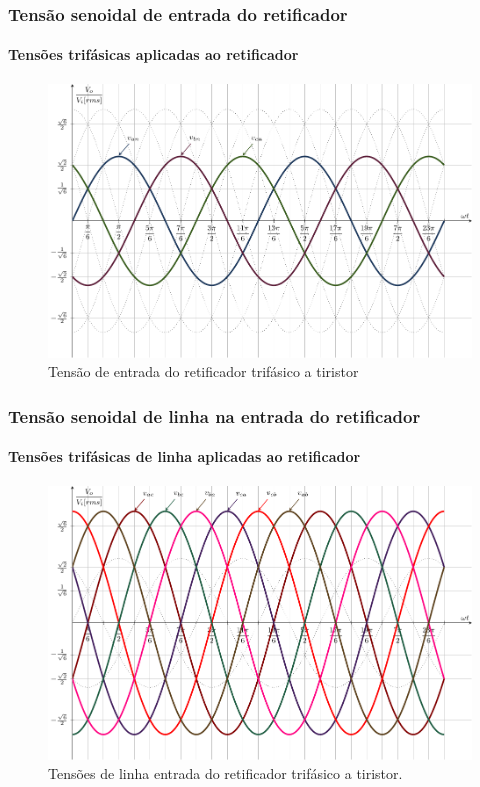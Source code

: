 \documentclass[aspectratio=43]{beamer}
\begin{document}
\begin{frame}
	\frametitle{Tensão senoidal de entrada do retificador}
		\framesubtitle{Tensões trifásicas aplicadas ao retificador}
\begin{figure}
	\centering
	\includegraphics[width=0.8\linewidth]{figuras/SenosDrawVabcnSEQn}
	\caption{Tensão de entrada do retificador trifásico a tiristor}
	\label{fig:SenosVabcn}
\end{figure}	
\end{frame}

\begin{frame}
	\frametitle{Tensão senoidal de linha na entrada do retificador}
	\framesubtitle{Tensões trifásicas de linha aplicadas ao retificador}
	
	\begin{figure}
\centering
\includegraphics[width=0.7\linewidth]{figuras/SenosDrawSEQnTensoesLinha}
\caption{Tensões de linha entrada do retificador trifásico a tiristor.}
\label{fig:SenosDrawSEQnTensoesLinha}
\end{figure}
	
\end{frame}
\end{document}
